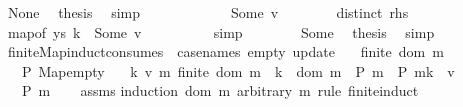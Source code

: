 \begin{isabellebody}
\ None\ \isamarkupfalse%
\ {\isacharquery}{\kern0pt}thesis\ \isamarkupfalse%
\ simp\isanewline
\ \ \ \ \isamarkupfalse%
\isanewline
\ \ \ \ \ \ \isamarkupfalse%
\ {\isacharparenleft}{\kern0pt}Some\ v{\isacharparenright}{\kern0pt}\isanewline
\ \ \ \ \ \ \isamarkupfalse%
\ distinct\ {\isacartoucheopen}{\isacharquery}{\kern0pt}rhs{\isacartoucheclose}\ \isamarkupfalse%
\ {\isachardoublequoteopen}map{\isacharunderscore}{\kern0pt}of\ ys\ k\ {\isacharequal}{\kern0pt}\ Some\ v{\isachardoublequoteclose}\isanewline
\ \ \ \ \ \ \ \ \isamarkupfalse%
\ simp\isanewline
\ \ \ \ \ \ \isamarkupfalse%
\ Some\ \isamarkupfalse%
\ {\isacharquery}{\kern0pt}thesis\ \isamarkupfalse%
\ simp\isanewline
\ \ \ \ \isamarkupfalse%
\isanewline
\ \ \isamarkupfalse%
\isanewline
{}\isamarkupfalse%
%
\endisatagproof
{\isafoldproof}%
%
\isadelimproof
\isanewline
%
\endisadelimproof
\isanewline
{}\isamarkupfalse%
\ finite{\isacharunderscore}{\kern0pt}Map{\isacharunderscore}{\kern0pt}induct{\isacharbrackleft}{\kern0pt}consumes\ {}{\isacharcomma}{\kern0pt}\ case{\isacharunderscore}{\kern0pt}names\ empty\ update{\isacharbrackright}{\kern0pt}{\isacharcolon}{\kern0pt}\isanewline
\ \ \ {\isachardoublequoteopen}finite\ {\isacharparenleft}{\kern0pt}dom\ m{\isacharparenright}{\kern0pt}{\isachardoublequoteclose}\isanewline
\ \ \ {\isachardoublequoteopen}P\ Map{\isachardot}{\kern0pt}empty{\isachardoublequoteclose}\isanewline
\ \ \ {\isachardoublequoteopen}{\isasymAnd}k\ v\ m{\isachardot}{\kern0pt}\ finite\ {\isacharparenleft}{\kern0pt}dom\ m{\isacharparenright}{\kern0pt}\ {\isasymLongrightarrow}\ k\ {\isasymnotin}\ dom\ m\ {\isasymLongrightarrow}\ P\ m\ {\isasymLongrightarrow}\ P\ {\isacharparenleft}{\kern0pt}m{\isacharparenleft}{\kern0pt}k\ {\isasymmapsto}\ v{\isacharparenright}{\kern0pt}{\isacharparenright}{\kern0pt}{\isachardoublequoteclose}\isanewline
\ \ \ {\isachardoublequoteopen}P\ m{\isachardoublequoteclose}\isanewline
%
\isadelimproof
\ \ %
\endisadelimproof
%
\isatagproof
{}\isamarkupfalse%
\ assms{\isacharparenleft}{\kern0pt}{}{\isacharparenright}{\kern0pt}\isanewline
{}\isamarkupfalse%
{\isacharparenleft}{\kern0pt}induction\ {\isachardoublequoteopen}dom\ m{\isachardoublequoteclose}\ arbitrary{\isacharcolon}{\kern0pt}\ m\ rule{\isacharcolon}{\kern0pt}\ finite{\isacharunderscore}{\kern0pt}induct{\isacharparenright}{\kern0pt}\isanewline

\end{isabellebody}
